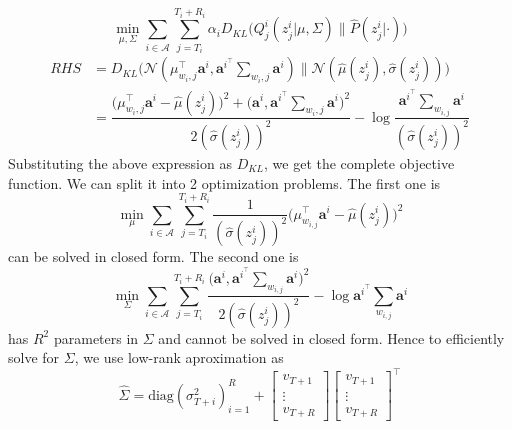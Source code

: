 \begin{equation}
	\min_{\mu, \Sigma} \sum_{i\in\mathcal A} \sum_{j=T_i}^{T_i+R_i} \alpha_i D_{KL}\Big(Q_j^i (z_j^i | \mu, \Sigma) \|\widehat{P}(z_j^i | \cdot)\Big)
\end{equation}
\begin{align*}
RHS &= D_{KL} \Big(\mathcal{N}(\mu^\top_{w_i, j} \mathbf{a}^i, \mathbf{a}^{i^\top} \sum_{w_i, j} \mathbf{a}^i)\|\mathcal{N}(\widehat{\mu}(z_j^i), \widehat{\sigma}(z_j^i))\Big) \\
&= \dfrac{\Big(\mu^\top_{w_i, j}\mathbf{a}^i - \widehat{\mu}(z_j^i)\Big)^2 + \Big(\mathbf{a}^i, \mathbf{a}^{i^\top} \sum_{w_i, j} \mathbf{a}^i\Big)^2}{2(\widehat{\sigma}(z_j^i))^2} - \log \dfrac{\mathbf{a}^{i^\top} \sum_{w_{i,j}}\mathbf{a}^i}{(\widehat{\sigma}(z_j^i))^2} 
\end{align*}
Substituting the above expression as $D_{KL}$, we get the complete objective function. We can split it into 2 optimization problems. The first one is
\begin{equation}
	\min_\mu \sum_{i\in\mathcal A} \sum_{j=T_i}^{T_i + R_i} \dfrac{1}{(\widehat{\sigma}(z_j^i))^2} \Big(\mu_{w_{i,j}}^\top \mathbf a^i - \widehat{\mu}(z_j^i)\Big)^2
\end{equation}
can be solved in closed form. The second one is
\begin{equation}
	\min_\Sigma \sum_{i\in\mathcal A} \sum_{j=T_i}^{T_i + R_i}  \dfrac{\Big(\mathbf{a}^i, \mathbf{a}^{i^\top} \sum_{w_{i,j}} \mathbf{a}^i\Big)^2}{2(\widehat{\sigma}(z_j^i))^2} - \log {\mathbf{a}^{i^\top} \sum_{w_{i,j}} \mathbf{a}^i}
\end{equation}
has $R^2$ parameters in $\Sigma$ and cannot be solved in closed form. Hence to efficiently solve for $\Sigma$, we use low-rank aproximation as
\begin{equation}
	\widehat{\Sigma} = \text{diag}(\sigma_{T+i}^2)_{i=1}^R + \begin{bmatrix}
		v_{T+1} \\ \vdots \\ v_{T+R}
	\end{bmatrix}
\begin{bmatrix}
	v_{T+1} \\ \vdots \\ v_{T+R}
\end{bmatrix}^\top
\end{equation}
